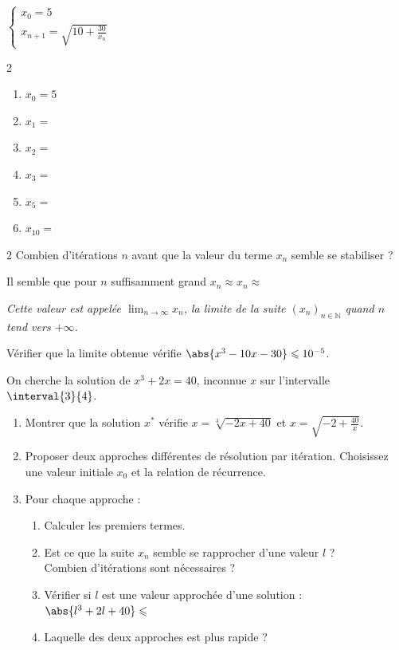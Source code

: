 \documentclass[main.tex]{subfiles}
\begin{document}
\parbox{0.24\linewidth}{
	$\begin{cases}
		x_0=5  \\ 
		x_{n+1}=\sqrt{10+\frac{30}{x_n}}
	\end{cases}$  
	\begin{spacing}{2}
		\begin{enumerate}[leftmargin=*, label={},]
			\item $x_0=5$
			\item $x_1= $
			\item $x_2= $
			\item $x_3= $
			\item $x_5= $ 
			\item $x_{10}= $
		\end{enumerate}
	\end{spacing} 
}
\begin{spacing}{2}
\noindent Combien d'itérations $n$ avant que la valeur du terme $x_n$ semble se stabiliser ? \dotfill 

\noindent Il semble que pour $n$ suffisamment grand $x_n \approx $\dotfill $x_n \approx $\dotfill 

\noindent \emph{Cette valeur est appelée $\lim_{n\to\infty}x_n$, la limite de la suite $(x_n)_{n\in\mathbb{N}}$ quand $n$ tend vers $+\infty$.} 

\noindent Vérifier que la limite obtenue vérifie $\abs{x^3-10x-30}\leqslant 10^{-5}$. 
\end{spacing} 
\vspace{-1.0em}
\begin{example}[à vous] On cherche la solution de $x^3+2x =40$, inconnue $x$ sur l'intervalle $\interval{3}{4}$.
		\begin{enumerate}[leftmargin=*,label=\arabic*)]
		\item Montrer que la solution $x^*$ vérifie $x=\sqrt[3]{-2x+40}$ et $x=\sqrt{-2+\frac{40}{x}}$.
		\item Proposer deux approches différentes de résolution par itération. Choisissez une valeur initiale $x_0$ et la relation de récurrence. 
		\item Pour chaque approche :
		\begin{enumerate}[leftmargin=*,label=\alph*)]
			\item Calculer les premiers termes.
			\item Est ce que la suite $x_n$ semble se rapprocher d'une valeur $l$ ?  \\
			  Combien d'itérations sont nécessaires ? 
			\item Vérifier si $l$ est une valeur approchée d'une solution : $\abs{l^3+2l+40}\leqslant $  
			\item Laquelle des deux approches est plus rapide ?
		\end{enumerate}
	\end{enumerate}
\end{example}
\end{document}
